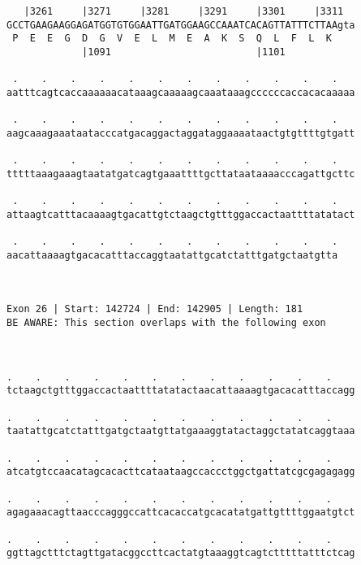 \documentclass{article}
\begin{document}
\begin{Verbatim}
   |3261     |3271     |3281     |3291     |3301     |3311  
GCCTGAAGAAGGAGATGGTGTGGAATTGATGGAAGCCAAATCACAGTTATTTCTTAAgta
 P  E  E  G  D  G  V  E  L  M  E  A  K  S  Q  L  F  L  K    
             |1091                         |1101            
  
 .    .    .    .    .    .    .    .    .    .    .    .   
aatttcagtcaccaaaaaacataaagcaaaaagcaaataaagccccccaccacacaaaaa
                                                            
 .    .    .    .    .    .    .    .    .    .    .    .   
aagcaaagaaataatacccatgacaggactaggataggaaaataactgtgttttgtgatt
                                                            
 .    .    .    .    .    .    .    .    .    .    .    .   
tttttaaagaaagtaatatgatcagtgaaattttgcttataataaaacccagattgcttc
                                                            
 .    .    .    .    .    .    .    .    .    .    .    .   
attaagtcatttacaaaagtgacattgtctaagctgtttggaccactaattttatatact
                                                            
 .    .    .    .    .    .    .    .    .    .    .    .
aacattaaaagtgacacatttaccaggtaatattgcatctatttgatgctaatgtta
                                                         
                                                         
 
Exon 26 | Start: 142724 | End: 142905 | Length: 181
BE AWARE: This section overlaps with the following exon



.    .    .    .    .    .    .    .    .    .    .    .    
tctaagctgtttggaccactaattttatatactaacattaaaagtgacacatttaccagg
                                                            
.    .    .    .    .    .    .    .    .    .    .    .    
taatattgcatctatttgatgctaatgttatgaaaggtatactaggctatatcaggtaaa
                                                            
.    .    .    .    .    .    .    .    .    .    .    .    
atcatgtccaacatagcacacttcataataagccaccctggctgattatcgcgagagagg
                                                            
.    .    .    .    .    .    .    .    .    .    .    .    
agagaaacagttaacccagggccattcacaccatgcacatatgattgttttggaatgtct
                                                            
.    .    .    .    .    .    .    .    .    .    .    .    
ggttagctttctagttgatacggccttcactatgtaaaggtcagtctttttatttctcag
                                                            

\end{Verbatim}
\end{document}

